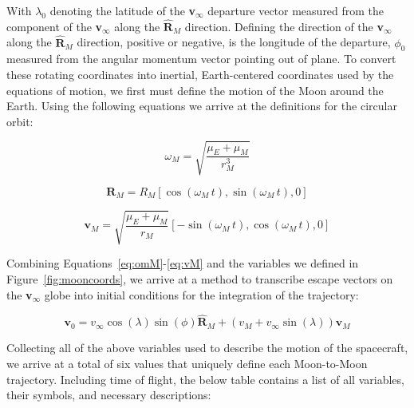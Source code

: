 \documentclass[letterpaper, paper,11pt]{AAS}	%
\begin{document}
With \(\lambda_0\) denoting the latitude of the \textbf{v}\(_\infty\) departure vector measured from the component of the \textbf{v}\(_\infty\) along the \(\hat{\mathbf{R}}_M\) direction. Defining the direction of the \textbf{v}\(_\infty\) along the \(\hat{\mathbf{R}}_M\) direction, positive or negative, is the longitude of the departure, \(\phi_0\) measured from the angular momentum vector pointing out of plane. To convert these rotating coordinates into inertial, Earth-centered coordinates used by the equations of motion, we first must define the motion of the Moon around the Earth. Using the following equations we arrive at the definitions for the circular orbit:

\begin{equation}
    \omega_M = \sqrt{\frac{\mu_E + \mu_M}{r_M^3}}
    \label{eq:omM}
\end{equation}

\begin{equation}
    \mathbf{R}_M = R_M[\cos(\omega_M\, t), \sin(\omega_M\, t), 0]
    \label{eq:RM}
\end{equation}

\begin{equation}
    \mathbf{v}_M = \sqrt{\frac{\mu_E + \mu_M}{r_M}}[-\sin(\omega_M\, t), \cos(\omega_M\, t), 0]
    \label{eq:vM}
\end{equation}

Combining Equations~\ref{eq:omM}-\ref{eq:vM} and the variables we defined in Figure~\ref{fig:mooncoords}, we arrive at a method to transcribe escape vectors on the \textbf{v}\(_\infty\) globe into initial conditions for the integration of the trajectory:

\begin{equation}
    \mathbf{v}_0 = v_\infty\cos(\lambda)\sin(\phi)\hat{\mathbf{R}}_M + (v_M + v_\infty\sin(\lambda))\hat{\mathbf{v}}_M
    \label{eq:vIC}
\end{equation}

Collecting all of the above variables used to describe the motion of the spacecraft, we arrive at a total of six values that uniquely define each Moon-to-Moon trajectory. Including time of flight, the below table contains a list of all variables, their symbols, and necessary descriptions:
\end{document}
